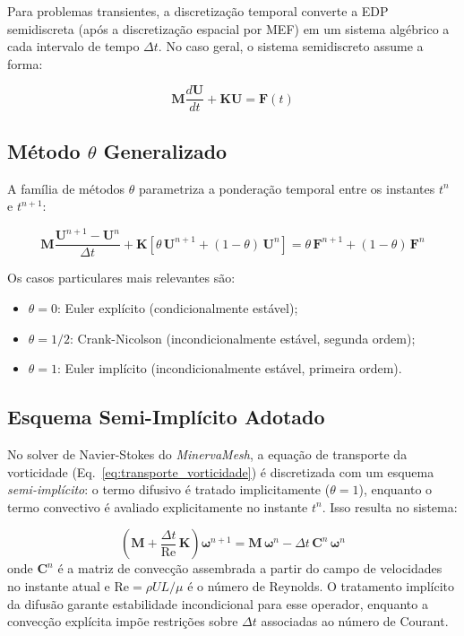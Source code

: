 Para problemas transientes, a discretização temporal converte a EDP semidiscreta (após a discretização espacial por MEF) em um sistema algébrico a cada intervalo de tempo $\Delta t$. No caso geral, o sistema semidiscreto assume a forma:

\begin{equation}
\mathbf{M} \frac{d\mathbf{U}}{dt} + \mathbf{K} \mathbf{U} = \mathbf{F}(t)
\label{eq:semidiscreto}
\end{equation}

\subsection{Método $\theta$ Generalizado}

A família de métodos $\theta$ parametriza a ponderação temporal entre os instantes $t^n$ e $t^{n+1}$:

\begin{equation}
\mathbf{M} \frac{\mathbf{U}^{n+1} - \mathbf{U}^n}{\Delta t} + \mathbf{K} \left[ \theta \, \mathbf{U}^{n+1} + (1 - \theta) \, \mathbf{U}^n \right] = \theta \, \mathbf{F}^{n+1} + (1 - \theta) \, \mathbf{F}^n
\label{eq:theta_method}
\end{equation}

Os casos particulares mais relevantes são:
\begin{itemize}
    \item $\theta = 0$: Euler explícito (condicionalmente estável);
    \item $\theta = 1/2$: Crank-Nicolson (incondicionalmente estável, segunda ordem);
    \item $\theta = 1$: Euler implícito (incondicionalmente estável, primeira ordem).
\end{itemize}

\subsection{Esquema Semi-Implícito Adotado}
\label{sec:semi_implicito}

No solver de Navier-Stokes do \textit{MinervaMesh}, a equação de transporte da vorticidade (Eq.~\ref{eq:transporte_vorticidade}) é discretizada com um esquema \textit{semi-implícito}: o termo difusivo é tratado implicitamente ($\theta = 1$), enquanto o termo convectivo é avaliado explicitamente no instante $t^n$. Isso resulta no sistema:

\begin{equation}
\boxed{\left( \mathbf{M} + \frac{\Delta t}{\text{Re}} \, \mathbf{K} \right) \boldsymbol{\omega}^{n+1} = \mathbf{M} \, \boldsymbol{\omega}^n - \Delta t \, \mathbf{C}^n \, \boldsymbol{\omega}^n}
\label{eq:sistema_temporal_ns}
\end{equation}
onde $\mathbf{C}^n$ é a matriz de convecção assembrada a partir do campo de velocidades no instante atual e $\text{Re} = \rho U L / \mu$ é o número de Reynolds. O tratamento implícito da difusão garante estabilidade incondicional para esse operador, enquanto a convecção explícita impõe restrições sobre $\Delta t$ associadas ao número de Courant.

